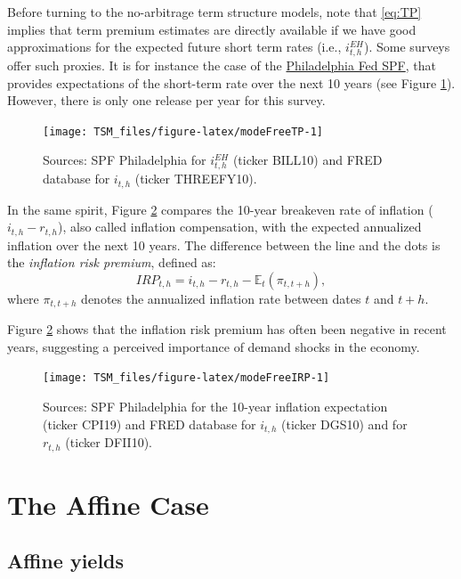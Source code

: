 \documentclass[
  12pt,
]{book}
\theoremstyle{definition}
\theoremstyle{definition}
\theoremstyle{definition}
\theoremstyle{definition}
\theoremstyle{remark}
\begin{document}
Before turning to the no-arbitrage term structure models, note that \eqref{eq:TP} implies that term premium estimates are directly available if we have good approximations for the expected future short term rates (i.e., \(i_{t,h}^{EH}\)). Some surveys offer such proxies. It is for instance the case of the \href{https://www.philadelphiafed.org/surveys-and-data/bill10}{Philadelphia Fed SPF}, that provides expectations of the short-term rate over the next 10 years (see Figure \ref{fig:modeFreeTP}). However, there is only one release per year for this survey.

\begin{figure}
\texttt{[image: TSM\_files/figure-latex/modeFreeTP-1]} \caption{Sources: SPF Philadelphia for $i_{t,h}^{EH}$ (ticker BILL10) and FRED database for $i_{t,h}$ (ticker THREEFY10).}\label{fig:modeFreeTP}
\end{figure}

In the same spirit, Figure \ref{fig:modeFreeIRP} compares the 10-year breakeven rate of inflation (\(i_{t,h}- r_{t,h}\)), also called inflation compensation, with the expected annualized inflation over the next 10 years. The difference between the line and the dots is the \emph{inflation risk premium}, defined as:
\[
IRP_{t,h} = i_{t,h} - r_{t,h} - \mathbb{E}_t(\pi_{t,t+h}),
\]
where \(\pi_{t,t+h}\) denotes the annualized inflation rate between dates \(t\) and \(t+h\).

Figure \ref{fig:modeFreeIRP} shows that the inflation risk premium has often been negative in recent years, suggesting a perceived importance of demand shocks in the economy.

\begin{figure}
\texttt{[image: TSM\_files/figure-latex/modeFreeIRP-1]} \caption{Sources: SPF Philadelphia for the 10-year inflation expectation (ticker CPI19) and FRED database for $i_{t,h}$ (ticker DGS10) and for $r_{t,h}$ (ticker DFII10).}\label{fig:modeFreeIRP}
\end{figure}

\hypertarget{RiskFreeAffine}{%
\section{The Affine Case}\label{RiskFreeAffine}}

\hypertarget{AffineYields}{%
\subsection{Affine yields}\label{AffineYields}}
\end{document}
